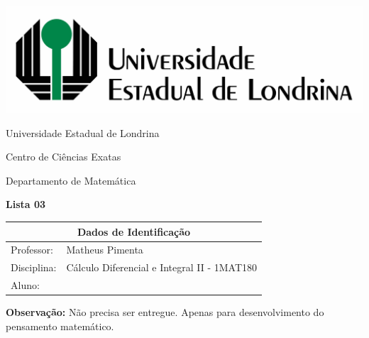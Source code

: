 \documentclass[oneside,a4paper,12pt]{article}
\newcommand{\universidade}{Universidade Estadual de Londrina}
\newcommand{\centro}{Centro de Ciências Exatas}
\newcommand{\departamento}{Departamento de Matemática}
\newcommand{\curso}{Ciência da Computação}
\newcommand{\professores}{Matheus Pimenta}
\newcommand{\disciplina}{Cálculo Diferencial e Integral II - 1MAT180}
\begin{document}
	\pagestyle{empty}
	
	\begin{center}
		\includegraphics[width=\linewidth/2]{logo.jpg}%
	 	\vspace{2pt} 	
		
		\universidade
		\par
		\centro
		\par
		\departamento
		\par
		\par
		\vspace{12pt}
		\LARGE \textbf{Lista 03}
		
	\end{center}
	
	\vspace{12pt}
	
	\begin{tabular}{ |l|p{12cm}| }
		
		\hline
		\multicolumn{2}{|c|}{\textbf{Dados de Identificação}} \\
		\hline
		Professor:         &    \professores           \\
		\hline
		Disciplina:        &    \disciplina          \\
		\hline
		Aluno:             &                   \\
		\hline
		
	\end{tabular}
	\vspace{6pt}
	
	{\bf Observação:} Não precisa ser entregue. Apenas para desenvolvimento do pensamento matemático.
	
	\begin{snugshade}
	\end{snugshade}
\end{document}

